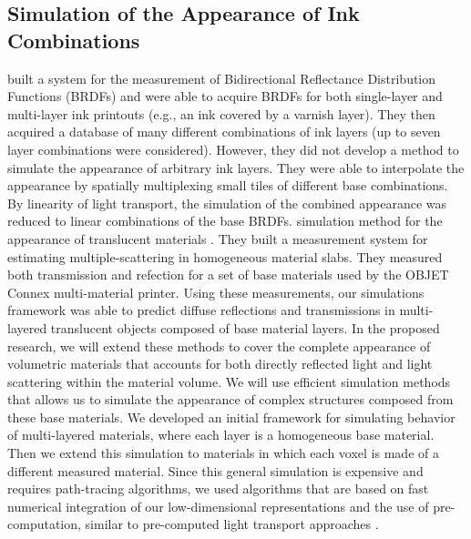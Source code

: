 \documentclass[annual]{acmsiggraph}
\begin{document}
\subsection{Simulation of the Appearance of Ink Combinations}
\cite{Matusik:2009} built a system
for the measurement of Bidirectional Reflectance Distribution Functions (BRDFs) and were able
to acquire BRDFs for both single-layer and multi-layer ink printouts (e.g., an ink covered by a
varnish layer). They then acquired a database of many different combinations of ink layers (up to
seven layer combinations were considered). However, they did not develop a method to simulate
the appearance of arbitrary ink layers. They were able to interpolate the appearance by spatially
multiplexing small tiles of different base combinations. By linearity of light transport, the simulation
of the combined appearance was reduced to linear combinations of the base BRDFs. 
simulation method for the appearance of translucent materials \cite{Hasan:2010}. 
They
built a measurement system for estimating multiple-scattering in homogeneous material slabs. They
measured both transmission and refection for a set of base materials used by the OBJET Connex
multi-material printer. 
Using these measurements, our simulations framework was able to predict
diffuse reflections and transmissions in multi-layered translucent objects composed of base material
layers.
In the proposed research, we will extend these methods to cover the complete appearance of
volumetric materials that accounts for both directly reflected light and light scattering within the
material volume. 
We will use efficient simulation methods that allows us to simulate the appearance
of complex structures composed from these base materials. We developed an initial framework for
simulating behavior of multi-layered materials, where each layer is a homogeneous base material.
Then we extend this simulation to materials in which each voxel is made of a different measured
material. Since this general simulation is expensive and requires path-tracing algorithms, we used
algorithms that are based on fast numerical integration of our low-dimensional representations
and the use of pre-computation, similar to pre-computed light transport approaches \cite{Sloan:2002}.
\end{document}
